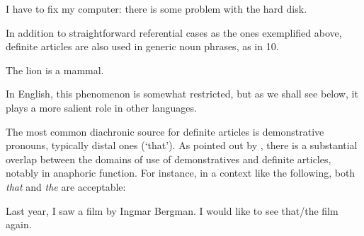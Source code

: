 \begin{listWWNumileveli}
\item {}

\begin{styleExample}
\label{bkm:Ref75942712}I have to fix my computer: there is some problem with the hard disk. 

\end{styleExample}

\end{listWWNumileveli}

\begin{styleBodyTextFirst}
In addition to straightforward referential cases as the ones exemplified above, definite articles are also used in generic noun phrases, as in 10. 

\end{styleBodyTextFirst}

\begin{listWWNumileveli}
\item {}

\begin{styleExample}
\label{bkm:Ref123549675}The lion is a mammal.

\end{styleExample}

\end{listWWNumileveli}

\begin{styleBodyTextFirst}
In English, this phenomenon is somewhat restricted, but as we shall see below, it plays a more salient role in other languages.

\end{styleBodyTextFirst}

\begin{styleBodytextC}
The most common diachronic source for definite articles is demonstrative pronouns, typically distal ones (‘that’). As pointed out by \citet[332]{Lyons1999}, there is a substantial overlap between the domains of use of demonstratives and definite articles, notably in anaphoric function. For instance, in a context like the following, both \textit{that} and \textit{the} are acceptable:

\end{styleBodytextC}

\begin{listWWNumileveli}
\item {}

\begin{styleExample}
Last year, I saw a film by Ingmar Bergman. I would like to see that/the film again.

\end{styleExample}

\end{listWWNumileveli}

